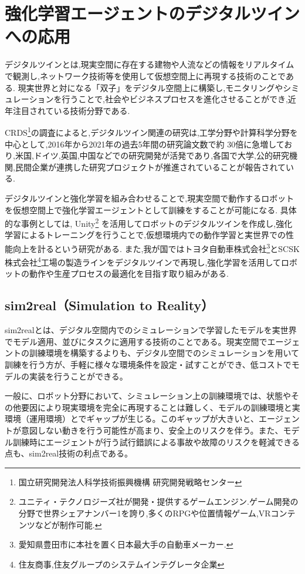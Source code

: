 \section{強化学習エージェントのデジタルツインへの応用}
デジタルツインとは,現実空間に存在する建物や人流などの情報をリアルタイムで観測し,ネットワーク技術等を使用して仮想空間上に再現する技術のことである.
現実世界と対になる「双子」をデジタル空間上に構築し,モニタリングやシミュレーションを行うことで,社会やビジネスプロセスを進化させることができ,近年注目されている技術分野である.\par 
CRDS\footnote{国立研究開発法人科学技術振興機構 研究開発戦略センター}の調査によると,デジタルツイン関連の研究は,工学分野や計算科学分野を中心として,2016年から2021年の過去5年間の研究論文数で約
30倍に急増しており,米国,ドイツ,英国,中国などでの研究開発が活発であり,各国で大学,公的研究機関,民間企業が連携した研究プロジェクトが推進されていることが報告されている\cite{CRDS2022DigitalTwin}.

デジタルツインと強化学習を組み合わせることで,現実空間で動作するロボットを仮想空間上で強化学習エージェントとして訓練をすることが可能になる.
具体的な事例としては,
Unity\footnote{ユニティ・テクノロジーズ社が開発・提供するゲームエンジン.ゲーム開発の分野で世界シェアナンバー1を誇り,多くのRPGや位置情報ゲーム,VRコンテンツなどが制作可能.}
を活用してロボットのデジタルツインを作成し,強化学習によるトレーニングを行うことで,仮想環境内での動作学習と実世界での性能向上を計るという研究がある\cite{unity_robot_digital_twin_2021}.
また,我が国ではトヨタ自動車株式会社\footnote{愛知県豊田市に本社を置く日本最大手の自動車メーカー.}とSCSK株式会社\footnote{住友商事,住友グループのシステムインテグレータ企業}工場の製造ラインをデジタルツインで再現し,強化学習を活用してロボットの動作や生産プロセスの最適化を目指す取り組みがある\cite{scsk_toyota_digital_twin_2024}.

\subsection{sim2real（Simulation to Reality）}
sim2realとは、デジタル空間内でのシミュレーションで学習したモデルを実世界でモデル適用、並びにタスクに適用する技術のことである。現実空間でエージェントの訓練環境を構築するよりも、デジタル空間でのシミュレーションを用いて訓練を行う方が、手軽に様々な環境条件を設定・試すことができ、低コストでモデルの実装を行うことができる。

一般に、ロボット分野において、シミュレーション上の訓練環境では、状態やその他要因により現実環境を完全に再現することは難しく、モデルの訓練環境と実環境（運用環境）とでギャップが生じる。このギャップが大きいと、エージェントが意図しない動きを行う可能性が高まり、安全上のリスクを伴う。また、モデル訓練時にエージェントが行う試行錯誤による事故や故障のリスクを軽減できる点も、sim2real技術の利点である。\par

